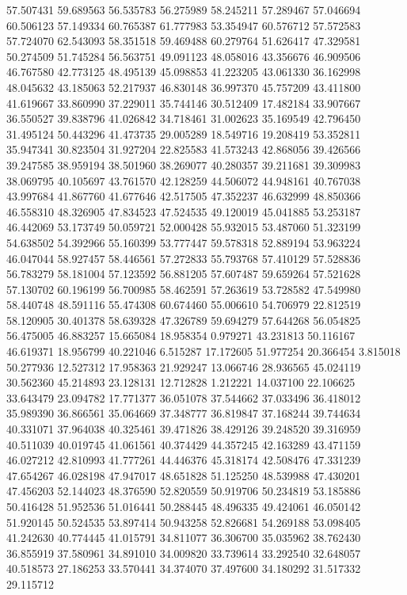 57.507431
59.689563
56.535783
56.275989
58.245211
57.289467
57.046694
60.506123
57.149334
60.765387
61.777983
53.354947
60.576712
57.572583
57.724070
62.543093
58.351518
59.469488
60.279764
51.626417
47.329581
50.274509
51.745284
56.563751
49.091123
48.058016
43.356676
46.909506
46.767580
42.773125
48.495139
45.098853
41.223205
43.061330
36.162998
48.045632
43.185063
52.217937
46.830148
36.997370
45.757209
43.411800
41.619667
33.860990
37.229011
35.744146
30.512409
17.482184
33.907667
36.550527
39.838796
41.026842
34.718461
31.002623
35.169549
42.796450
31.495124
50.443296
41.473735
29.005289
18.549716
19.208419
53.352811
35.947341
30.823504
31.927204
22.825583
41.573243
42.868056
39.426566
39.247585
38.959194
38.501960
38.269077
40.280357
39.211681
39.309983
38.069795
40.105697
43.761570
42.128259
44.506072
44.948161
40.767038
43.997684
41.867760
41.677646
42.517505
47.352237
46.632999
48.850366
46.558310
48.326905
47.834523
47.524535
49.120019
45.041885
53.253187
46.442069
53.173749
50.059721
52.000428
55.932015
53.487060
51.323199
54.638502
54.392966
55.160399
53.777447
59.578318
52.889194
53.963224
46.047044
58.927457
58.446561
57.272833
55.793768
57.410129
57.528836
56.783279
58.181004
57.123592
56.881205
57.607487
59.659264
57.521628
57.130702
60.196199
56.700985
58.462591
57.263619
53.728582
47.549980
58.440748
48.591116
55.474308
60.674460
55.006610
54.706979
22.812519
58.120905
30.401378
58.639328
47.326789
59.694279
57.644268
56.054825
56.475005
46.883257
15.665084
18.958354
0.979271
43.231813
50.116167
46.619371
18.956799
40.221046
6.515287
17.172605
51.977254
20.366454
3.815018
50.277936
12.527312
17.958363
21.929247
13.066746
28.936565
45.024119
30.562360
45.214893
23.128131
12.712828
1.212221
14.037100
22.106625
33.643479
23.094782
17.771377
36.051078
37.544662
37.033496
36.418012
35.989390
36.866561
35.064669
37.348777
36.819847
37.168244
39.744634
40.331071
37.964038
40.325461
39.471826
38.429126
39.248520
39.316959
40.511039
40.019745
41.061561
40.374429
44.357245
42.163289
43.471159
46.027212
42.810993
41.777261
44.446376
45.318174
42.508476
47.331239
47.654267
46.028198
47.947017
48.651828
51.125250
48.539988
47.430201
47.456203
52.144023
48.376590
52.820559
50.919706
50.234819
53.185886
50.416428
51.952536
51.016441
50.288445
48.496335
49.424061
46.050142
51.920145
50.524535
53.897414
50.943258
52.826681
54.269188
53.098405
41.242630
40.774445
41.015791
34.811077
36.306700
35.035962
38.762430
36.855919
37.580961
34.891010
34.009820
33.739614
33.292540
32.648057
40.518573
27.186253
33.570441
34.374070
37.497600
34.180292
31.517332
29.115712
